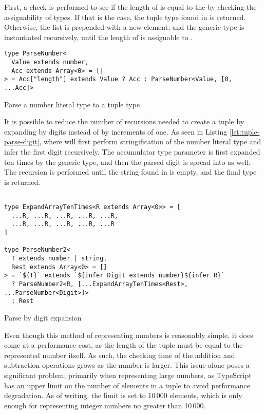 First, a check is performed to see if the length of  is equal to the  by checking the assignability of types. If that is the case, the tuple type found in  is returned. Otherwise, the list is prepended with a new  element, and the generic type is instantiated recursively, until the length of  is assignable to .

\begin{listing}[ht]
  \begin{verbatim}
type ParseNumber<
  Value extends number,
  Acc extends Array<0> = []
> = Acc["length"] extends Value ? Acc : ParseNumber<Value, [0, ...Acc]>
\end{verbatim}
  \caption{Parse a number literal type to a tuple type}\label{lst:tuple-parse}
\end{listing}

It is possible to reduce the number of recursions needed to create a tuple by expanding by digits instead of by increments of one. As seen in Listing \ref{lst:tuple-parse-digit}, where  will first perform stringification of the number literal type  and infer the first digit recursively. The accumulator type parameter  is first expanded ten times by the  generic type, and then the parsed digit is spread into  as well. The recursion is performed until the string found in  is empty, and the final  type is returned.

\begin{listing}[ht]
  \begin{verbatim}

type ExpandArrayTenTimes<R extends Array<0>> = [
  ...R, ...R, ...R, ...R, ...R,
  ...R, ...R, ...R, ...R, ...R
]
    
type ParseNumber2<
  T extends number | string,
  Rest extends Array<0> = []
> = `${T}` extends `${infer Digit extends number}${infer R}`
  ? ParseNumber2<R, [...ExpandArrayTenTimes<Rest>, ...ParseNumber<Digit>]>
  : Rest
\end{verbatim}
  \caption{Parse by digit expansion}\label{lst:tuple-parse-digit}
\end{listing}

Even though this method of representing numbers is reasonably simple, it does come at a performance cost, as the length of the tuple must be equal to the represented number itself. As such, the checking time of the addition and subtraction operations grows as the number is larger. This issue alone poses a significant problem, primarily when representing large numbers, as TypeScript has an upper limit on the number of elements in a tuple to avoid performance degradation. As of writing, the limit is set to 10\,000 elements\cite{ImplementationCheckerTs2023}, which is only enough for representing integer numbers no greater than 10\,000.

